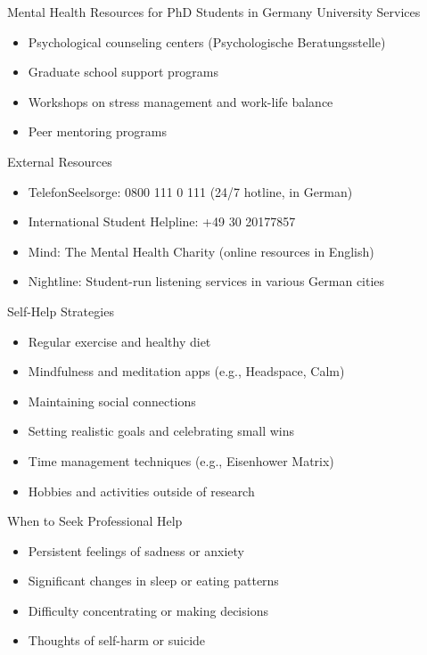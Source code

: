 \documentclass[aspectratio=169,10pt]{beamer}
\begin{document}
\begin{frame}{Mental Health Resources for PhD Students in Germany}
\alert{University Services}
\begin{itemize}
    \item Psychological counseling centers (Psychologische Beratungsstelle)
    \item Graduate school support programs
    \item Workshops on stress management and work-life balance
    \item Peer mentoring programs
\end{itemize}

\alert{External Resources}
\begin{itemize}
    \item TelefonSeelsorge: 0800 111 0 111 (24/7 hotline, in German)
    \item International Student Helpline: +49 30 20177857
    \item Mind: The Mental Health Charity (online resources in English)
    \item Nightline: Student-run listening services in various German cities
\end{itemize}

\alert{Self-Help Strategies}
\begin{itemize}
    \item Regular exercise and healthy diet
    \item Mindfulness and meditation apps (e.g., Headspace, Calm)
    \item Maintaining social connections
    \item Setting realistic goals and celebrating small wins
    \item Time management techniques (e.g., Eisenhower Matrix)
    \item Hobbies and activities outside of research
\end{itemize}

\alert{When to Seek Professional Help}
\begin{itemize}
    \item Persistent feelings of sadness or anxiety
    \item Significant changes in sleep or eating patterns
    \item Difficulty concentrating or making decisions
    \item Thoughts of self-harm or suicide
\end{itemize}
\end{frame}
\end{document}
